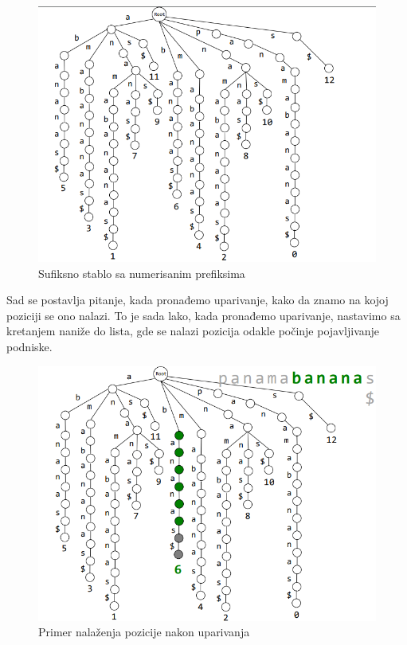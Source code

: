 \begin{figure}[h!]
\centering
\includegraphics[scale=0.5]{poglavlja/9/slike/sufiksnoStabloNumerisaniPrefiksi.png}
\caption{Sufiksno stablo sa numerisanim prefiksima}
\label{slika:X}
\end{figure}

\clearpage
Sad se postavlja pitanje, kada pronađemo uparivanje, kako da znamo na kojoj poziciji se ono nalazi. To je sada lako, kada pronađemo uparivanje, nastavimo sa kretanjem naniže do lista, gde se nalazi pozicija odakle počinje pojavljivanje podniske. 

\begin{figure}[h!]
\centering
\includegraphics[scale=0.5]{poglavlja/9/slike/sufiksnoStabloNaciIndeksPocetka.png}
\caption{Primer nalaženja pozicije nakon uparivanja}
\label{slika:X}
\end{figure}

